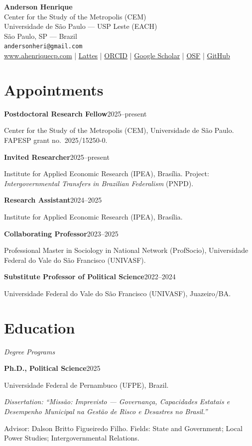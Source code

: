 \documentclass[11pt]{article}
\newcommand{\cvsubsection}[1]{\vspace{0.9em}\textit{#1}\par\vspace{0.35em}}
\newcommand{\entry}[2]{\noindent\textbf{#1}\hfill #2\par\vspace{0.15em}}
\newcommand{\detail}[1]{\noindent\hspace*{1.5em}#1\par\vspace{0.15em}}
\newcommand{\detailem}[1]{\noindent\hspace*{1.5em}\textit{#1}\par\vspace{0.15em}}
\begin{document}
\begin{center}
{\LARGE \textbf{Anderson Henrique}}\\[0.5em]
Center for the Study of the Metropolis (CEM)\\
Universidade de São Paulo --- USP Leste (EACH)\\
São Paulo, SP --- Brazil\\[0.3em]
\texttt{andersonheri@gmail.com} \\[0.15em]
\href{https://www.ahenriquecp.com}{www.ahenriquecp.com} \quad|\quad
\href{http://lattes.cnpq.br/7628365040600511}{Lattes} \quad|\quad
\href{https://orcid.org/0000-0002-1842-2725}{ORCID} \quad|\quad
\href{https://scholar.google.com/citations?user=YGNu2fsAAAAJ}{Google Scholar} \quad|\quad
\href{https://osf.io/ysj2q/}{OSF} \quad|\quad
\href{https://github.com/andersonheri}{GitHub}
\end{center}

\vspace{1em}

\section{Appointments}

\entry{Postdoctoral Research Fellow}{2025--present}
\detail{Center for the Study of the Metropolis (CEM), Universidade de São Paulo. FAPESP grant no.\ 2025/15250-0.}

\entry{Invited Researcher}{2025--present}
\detail{Institute for Applied Economic Research (IPEA), Brasília. Project: \textit{Intergovernmental Transfers in Brazilian Federalism} (PNPD).}

\entry{Research Assistant}{2024--2025}
\detail{Institute for Applied Economic Research (IPEA), Brasília.}

\entry{Collaborating Professor}{2023--2025}
\detail{Professional Master in Sociology in National Network (ProfSocio), Universidade Federal do Vale do São Francisco (UNIVASF).}

\entry{Substitute Professor of Political Science}{2022--2024}
\detail{Universidade Federal do Vale do São Francisco (UNIVASF), Juazeiro/BA.}

\section{Education}
\cvsubsection{Degree Programs}

\entry{Ph.D., Political Science}{2025}
\detail{Universidade Federal de Pernambuco (UFPE), Brazil.}
\detailem{Dissertation: ``Missão: Imprevisto --- Governança, Capacidades Estatais e Desempenho Municipal na Gestão de Risco e Desastres no Brasil.''}
\detail{Advisor: Dalson Britto Figueiredo Filho. Fields: State and Government; Local Power Studies; Intergovernmental Relations.}
\end{document}
